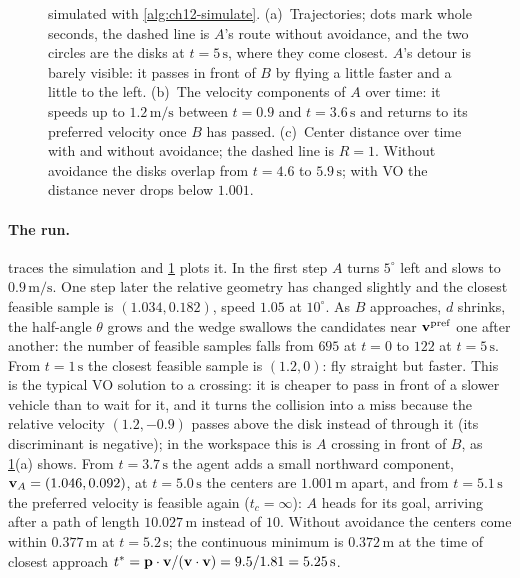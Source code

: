 \begin{figure}[tb]
  \centering
  \caption{ simulated with \cref{alg:ch12-simulate}.
  (a)~Trajectories; dots mark whole seconds, the dashed line is $A$'s route
  without avoidance, and the two circles are the disks at $t = 5\,\mathrm{s}$,
  where they come closest. $A$'s detour is barely visible: it passes in front
  of $B$ by flying a little faster and a little to the left. (b)~The velocity
  components of $A$ over time: it speeds up to $1.2\,\mathrm{m/s}$ between
  $t=0.9$ and $t=3.6\,\mathrm{s}$ and returns to its preferred velocity once
  $B$ has passed. (c)~Center distance over time with and without avoidance;
  the dashed line is $R = 1$. Without avoidance the disks overlap from
  $t=4.6$ to $5.9\,\mathrm{s}$; with VO the distance never drops below
  $1.001$.}
  \label{fig:ch12-example}
\end{figure}

\paragraph{The run.}
 traces the simulation and \cref{fig:ch12-example} plots
it. In the first step $A$ turns $5^\circ$ left and slows to $0.9\,\mathrm{m/s}$.
One step later the relative geometry has changed slightly and the closest
feasible sample is $(1.034, 0.182)$, speed $1.05$ at $10^\circ$. As $B$
approaches, $d$ shrinks, the half-angle $\theta$ grows and the wedge swallows
the candidates near $\mathbf{v}^{\mathrm{pref}}$ one after another: the number of
feasible samples falls from $695$ at $t=0$ to $122$ at $t = 5\,\mathrm{s}$. From
$t = 1\,\mathrm{s}$ the closest feasible sample is $(1.2, 0)$: fly straight but
faster. This is the typical VO solution to a crossing: it is cheaper to pass in
front of a slower vehicle than to wait for it, and it turns the collision into
a miss because the relative velocity $(1.2,-0.9)$ passes above the disk
instead of through it (its discriminant is negative); in the workspace this is
$A$ crossing in front of $B$, as \cref{fig:ch12-example}(a) shows. From $t=3.7\,\mathrm{s}$ the agent adds a
small northward component, $\mathbf{v}_A = (1.046, 0.092)$, at $t = 5.0\,\mathrm{s}$ the centers are
$1.001\,\mathrm{m}$ apart, and from $t=5.1\,\mathrm{s}$ the preferred velocity is
feasible again ($t_c = \infty$): $A$ heads for its goal, arriving after a path
of length $10.027\,\mathrm{m}$ instead of $10$. Without avoidance the centers
come within $0.377\,\mathrm{m}$ at $t = 5.2\,\mathrm{s}$; the continuous minimum
is $0.372\,\mathrm{m}$ at the time of closest approach
$t^* = \mathbf{p}\cdot\mathbf{v}/(\mathbf{v}\cdot\mathbf{v}) = 9.5/1.81 = 5.25\,\mathrm{s}$.

